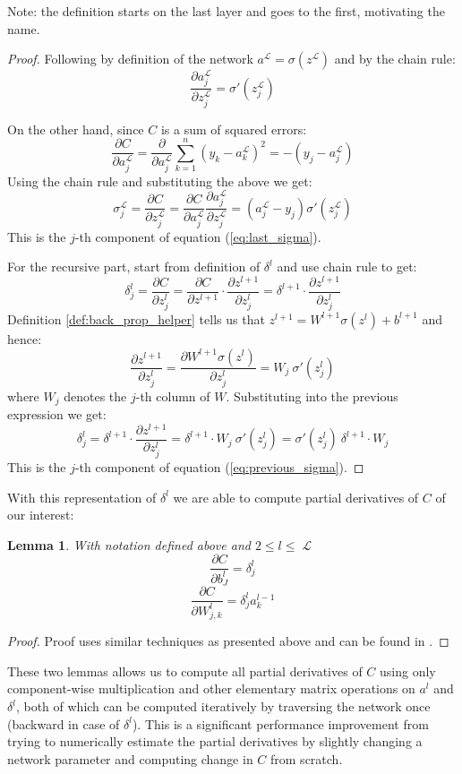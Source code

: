 \documentclass[a4paper,11pt]{article}
\theoremstyle{break}
\newtheorem{lemma}[theorem]{Lemma}
\newcommand{\Part}[2]{\frac{\partial #1}{\partial #2}}
\DeclareMathOperator{\La}{\mathcal{L}}
\begin{document}
Note: the definition starts on the last layer and goes to the first, motivating the name.

\begin{proof}
    Following \cite{higham} by definition of the network 
    $a^{\La} = \sigma(z^{\La})$ and by the chain rule:
    $$ \Part{a_j^{\La}}{z_j^{\La}} = \sigma' (z_j^{\La}) $$
    
    On the other hand, since $C$ is a sum of squared errors:
    $$ \Part{C}{a_j^{\La}} = \Part{}{a_j^{\La}} \sum_{k=1}^n (y_k - a_k^{\La})^2 = - (y_j - a_j^{\La})$$
    Using the chain rule and substituting the above we get:
    $$ \sigma_j^{\La} = \Part{C}{z_j^{\La}} = \Part{C}{a_j^{\La}} \Part{a_j^{\La}}{z_j^{\La}} = (a_j^{\La} - y_j) \sigma' (z_j^{\La})$$
    This is the $j$-th component of equation (\ref{eq:last_sigma}).
    
    For the recursive part, start from definition of $\delta^l$ and use chain rule to get:
    $$ \delta^l_j = \Part{C}{z_j^l} =
       \Part{C}{z^{l+1}} \cdot \Part{z^{l+1}}{z_j^l} = 
       \delta^{l+1}      \cdot \Part{z^{l+1}}{z_j^l} $$
    Definition \ref{def:back_prop_helper} tells us that
    $ z^{l+1} = W^{l+1} \sigma(z^{l}) + b^{l+1} $
    and hence:
    $$  \Part{z^{l+1}}{z^l_j} =
        \Part{W^{l+1} \sigma(z^l)}{z_j^l} = W_{j} ~ \sigma'(z_j^l)$$
    where $W_{j}$ denotes the $j$-th column of $W$. Substituting into the previous expression we get:
    $$ \delta^l_j = \delta^{l+1} \cdot \Part{z^{l+1}}{z_j^l}
     = \delta^{l+1} \cdot W_{j} ~ \sigma'(z_j^l) = \sigma'(z_j^l) ~ \delta^{l+1} \cdot W_{j}$$
    This is the $j$-th component of equation (\ref{eq:previous_sigma}).
\end{proof}

With this representation of $\delta^l$ we are able to compute partial derivatives of $C$ of our interest:
\begin{lemma}
    With notation defined above and $ 2 \leq l \leq \La$
     $$ \Part{C}{b_J^l} = \delta_j^l $$
     $$ \Part{C}{W^l_{j, k}} = \delta^l_j a_k^{l-1} $$
\end{lemma}
\begin{proof}
    Proof uses similar techniques as presented above and can be found in \cite[p14]{higham}.
\end{proof}

These two lemmas allows us to compute all partial derivatives of $C$ using only component-wise multiplication and other elementary matrix operations on $a^l$ and $\delta^l$, both of which can be computed iteratively by traversing the network once (backward in case of $\delta^l$). This is a significant performance improvement from trying to numerically estimate the partial derivatives by slightly changing a network parameter and computing change in $C$ from scratch.
\end{document}
